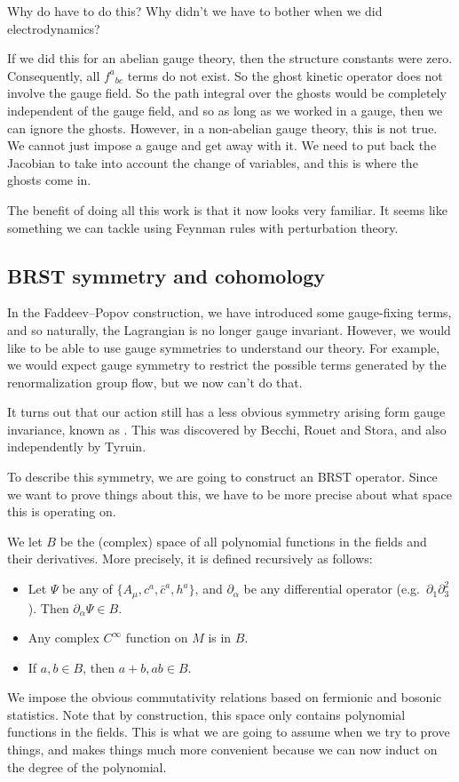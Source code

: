 \documentclass[a4paper]{article}
\begin{document}
Why do have to do this? Why didn't we have to bother when we did electrodynamics?

If we did this for an abelian gauge theory, then the structure constants were zero. Consequently, all $f^a\!_{bc}$ terms do not exist. So the ghost kinetic operator does not involve the gauge field. So the path integral over the ghosts would be completely independent of the gauge field, and so as long as we worked in a gauge, then we can ignore the ghosts. However, in a non-abelian gauge theory, this is not true. We cannot just impose a gauge and get away with it. We need to put back the Jacobian to take into account the change of variables, and this is where the ghosts come in.

The benefit of doing all this work is that it now looks very familiar. It seems like something we can tackle using Feynman rules with perturbation theory.

\subsection{BRST symmetry and cohomology}
In the Faddeev--Popov construction, we have introduced some gauge-fixing terms, and so naturally, the Lagrangian is no longer gauge invariant. However, we would like to be able to use gauge symmetries to understand our theory. For example, we would expect gauge symmetry to restrict the possible terms generated by the renormalization group flow, but we now can't do that.

It turns out that our action still has a less obvious symmetry arising form gauge invariance, known as . This was discovered by Becchi, Rouet and Stora, and also independently by Tyruin.

To describe this symmetry, we are going to construct an BRST operator. Since we want to prove things about this, we have to be more precise about what space this is operating on.

We let $B$ be the (complex) space of all polynomial functions in the fields and their derivatives. More precisely, it is defined recursively as follows:
\begin{itemize}
  \item Let $\Psi$ be any of $\{A_\mu, c^a, \bar{c}^a, h^a\}$, and $\partial_\alpha$ be any differential operator (e.g.\ $\partial_1 \partial_3^2$). Then $\partial_\alpha \Psi \in B$.
  \item Any complex $C^\infty$ function on $M$ is in $B$.
  \item If $a, b \in B$, then $a + b, ab \in B$.
\end{itemize}
We impose the obvious commutativity relations based on fermionic and bosonic statistics. Note that by construction, this space only contains polynomial functions in the fields. This is what we are going to assume when we try to prove things, and makes things much more convenient because we can now induct on the degree of the polynomial.
\end{document}
